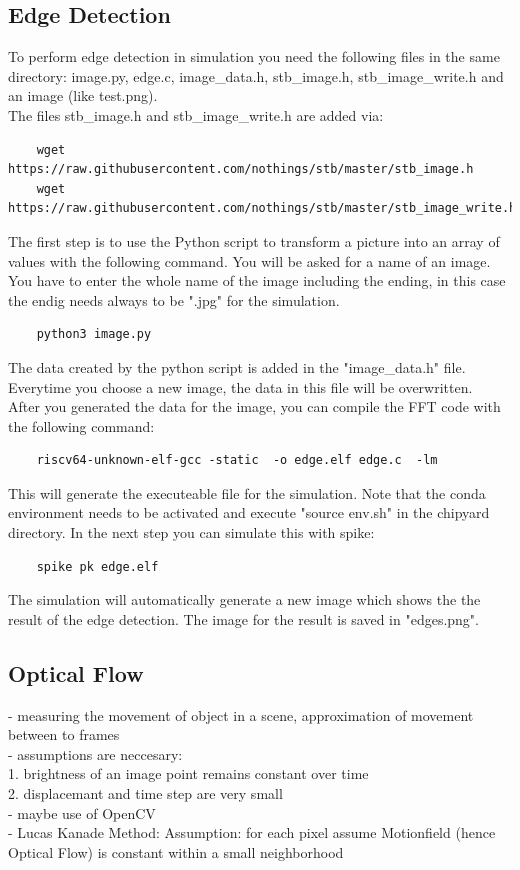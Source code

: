 \documentclass{article}
\begin{document}
{\subsection*{Edge Detection}
To perform edge detection in simulation you need the following files in the same directory: image.py, edge.c, image\_data.h, stb\_image.h, stb\_image\_write.h and an image (like test.png).\\
The files stb\_image.h and stb\_image\_write.h are added via:\\
\begin{verbatim}
    wget https://raw.githubusercontent.com/nothings/stb/master/stb_image.h
    wget https://raw.githubusercontent.com/nothings/stb/master/stb_image_write.h
\end{verbatim}
The first step is to use the Python script to transform a picture into an array of values with 
the following command. You will be asked for a name of an image. You have to enter the whole name of the image including the ending, in this case the endig needs always to be ".jpg" for the simulation.\\
\begin{verbatim}
    python3 image.py
\end{verbatim} 
The data created by the python script is added in the "image\_data.h" file. Everytime you choose a new image, the data in this file will be overwritten.\\
After you generated the data for the image, you can compile the FFT code with the following command:\\
\begin{verbatim}
    riscv64-unknown-elf-gcc -static  -o edge.elf edge.c  -lm
\end{verbatim}
This will generate the executeable file for the simulation. Note that the conda environment needs to be activated and execute "source env.sh" in the chipyard directory. In the next step you can simulate this with spike:\\
\begin{verbatim}
    spike pk edge.elf
\end{verbatim}
The simulation will automatically generate a new image which shows the the result of the edge detection. The image for the result is saved in "edges.png".
\subsection*{Optical Flow}
- measuring the movement of object in a scene, approximation of movement between to frames\\
- assumptions are neccesary: \\
1. brightness of an image point remains constant over time\\
2. displacemant and time step are very small\\
- maybe use of OpenCV \\
- Lucas Kanade Method: Assumption: for each pixel assume Motionfield (hence Optical Flow) is constant within a small neighborhood



}
\end{document}
